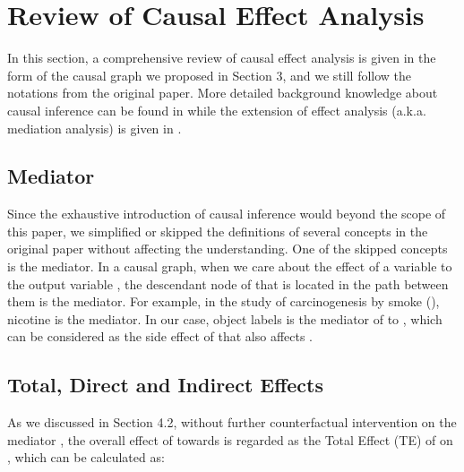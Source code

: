 \documentclass[10pt,twocolumn,letterpaper]{article}
\begin{document}
\clearpage
\appendix
\begin{abstract}
This supplementary document is organized as follows: 1) section~\ref{sec:review}: a comprehensive review of causal effect analysis in causal inference; 2) section~\ref{sec:networks}: more details of the simplified network structures in the original paper; 3) section~\ref{sec:quantitative}: more quantitative studies; 4) section~\ref{sec:qualitative}: more qualitative studies.
\end{abstract}

\section{Review of Causal Effect Analysis}
\label{sec:review}
In this section, a comprehensive review of causal effect analysis is given in the form of the causal graph we proposed in Section 3, and we still follow the notations from the original paper. More detailed background knowledge about causal inference can be found in \cite{pearl2016causal, Judea2018thebookofwhy} while the extension of effect analysis (a.k.a. mediation analysis) is given in \cite{robins1992identifiability, pearl2001direct, vanderweele2013three, vanderweele2015explanation}. 

\subsection{Mediator}
Since the exhaustive introduction of causal inference would beyond the scope of this paper, we simplified or skipped the definitions of several concepts in the original paper without affecting the understanding. One of the skipped concepts is the mediator. In a causal graph, when we care about the effect of a variable  to the output variable , the descendant node of  that is located in the path between them is the mediator. For example, in the study of carcinogenesis by smoke (), nicotine is the mediator. In our case, object labels  is the mediator of  to , which can be considered as the side effect of  that also affects . 

\subsection{Total, Direct and Indirect Effects}
As we discussed in Section 4.2, without further counterfactual intervention on the mediator , the overall effect of  towards  is regarded as the Total Effect (TE) of  on , which can be calculated as:
\end{document}

